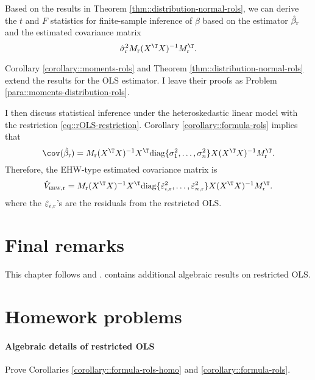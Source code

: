 Based on the results in Theorem \ref{thm::distribution-normal-rols}, we can derive the $t$ and $F$ statistics for finite-sample inference of $\beta$ based on the estimator $\hat{\beta}_\textup{r} $ and the estimated covariance matrix
$$
\hat{\sigma}^2_\textup{r}  M_\textup{r} (X^{\T}X)^{-1} M_\textup{r}^{\T} . 
$$

Corollary \ref{corollary::moments-rols} and Theorem \ref{thm::distribution-normal-rols} extend the results for the OLS estimator. I leave their proofs as Problem  \ref{para::moments-distribution-rols}. 

 





 I then discuss statistical inference under the heteroskedastic linear model with the restriction \eqref{eq::rOLS-restriction}. Corollary \ref{corollary::formula-rols} implies that
 $$
 \cov(  \hat{\beta}_\textup{r}   )
=
 M_\textup{r} (X^{\T}X)^{-1}  X^{\T} \text{diag}\{\sigma_1^2, \ldots, \sigma_n^2 \}  X     (X^{\T}X)^{-1} M_\textup{r}^{\T}.
 $$
 Therefore, the EHW-type estimated covariance matrix is
 $$
 \hat{V}_{\textsc{ehw}, \textup{r}}
=
M_\textup{r} (X^{\T}X)^{-1}  
X^{\T} \text{diag}\{   \hat{\varepsilon}_{i, \textup{r}}^2 , \ldots, \hat{\varepsilon}_{n, \textup{r}}^2 \}  X    
 (X^{\T}X)^{-1} M_\textup{r}^{\T}.
 $$ 
 where the $\hat{\varepsilon}_{i, \textup{r}}$'s are the residuals from the restricted OLS. 


 


\section{Final remarks}


This chapter follows \citet{theil} and \cite{rao}. \citet{tarpey2000note} contains additional algebraic results on restricted OLS. 
  




\section{Homework problems}

\paragraph{Algebraic details of restricted OLS}
\label{para::algebra-rols}

Prove Corollaries \ref{corollary::formula-rols-homo} and \ref{corollary::formula-rols}. 




